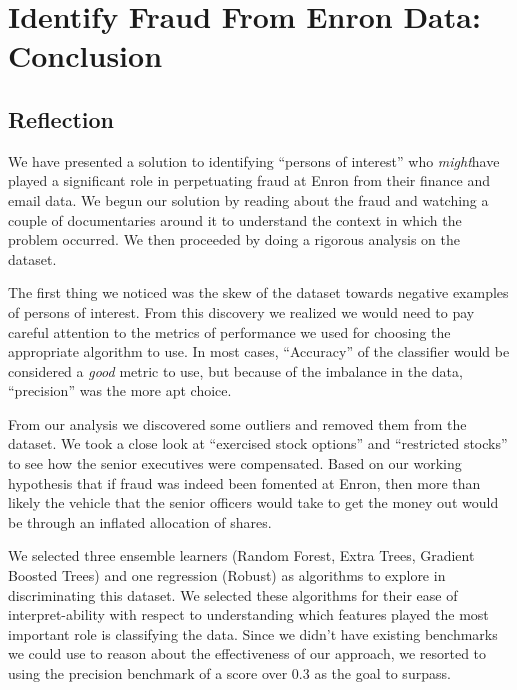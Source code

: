 \documentclass[twoside,openright,titlepage,numbers=noenddot,headinclude,%
               footinclude=true,cleardoublepage=empty,abstractoff,BCOR=5mm,%
               paper=a4,fontsize=11pt,ngerman,american]{scrreprt}
\numberwithin{theorem}{chapter}
\numberwithin{definition}{chapter}
\numberwithin{algorithm}{chapter}
\numberwithin{figure}{chapter}
\numberwithin{table}{chapter}
\numberwithin{equation}{chapter}
\begin{document}

\chapter*{Identify Fraud From Enron Data: Conclusion}


\section*{Reflection}

We have presented a solution to identifying ``persons of interest'' who \textit{might}have played a significant role in perpetuating fraud at Enron from their finance and email data. We begun our solution by reading about the fraud and watching a couple of documentaries around it to understand the context in which the problem occurred. We then proceeded by doing a rigorous analysis on the dataset. 

The first thing we noticed was the skew of the dataset towards negative examples of persons of interest. From this discovery we realized we would need to pay careful attention to the metrics of performance we used for choosing the appropriate algorithm to use. In most cases, ``Accuracy'' of the classifier would be considered a \textit{good} metric to use, but because of the imbalance in the data, ``precision'' was the more apt choice.

From our analysis we discovered some outliers and removed them from the dataset. We took a close look at ``exercised stock options'' and ``restricted stocks'' to see how the senior executives were compensated. Based on our working hypothesis that if fraud was indeed been fomented at Enron, then more than likely the vehicle that the senior officers would take to get the money out would be through an inflated allocation of shares. 

We selected three ensemble learners (Random Forest, Extra Trees, Gradient Boosted Trees) and one regression (Robust) as algorithms to explore in discriminating this dataset. We selected these algorithms for their ease of interpret-ability with respect to understanding which features played the most important role is classifying the data. Since we didn't have existing benchmarks we could use to reason about the effectiveness of our approach, we resorted to using the precision benchmark of a score over 0.3 as the goal to surpass.
\end{document}
